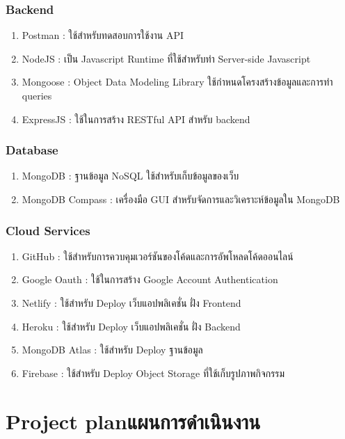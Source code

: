 \subsubsection{Backend}
\begin{enumerate}
    \item Postman\cite{postman} : ใช้สำหรับทดสอบการใช้งาน API
    \item NodeJS\cite{node1} : เป็น Javascript Runtime ที่ใช้สำหรับทำ Server-side Javascript
    \item Mongoose\cite{mongoose} : Object Data Modeling Library ใช้กำหนดโครงสร้างข้อมูลและการทำ queries 
    \item ExpressJS\cite{express1} : ใช้ในการสร้าง RESTful API สำหรับ backend
\end{enumerate}
\subsubsection{Database}
\begin{enumerate}
    \item MongoDB\cite{mongodb} : ฐานข้อมูล NoSQL ใช้สำหรับเก็บข้อมูลของเว็บ
    \item MongoDB Compass\cite{compass} : เครื่องมือ GUI สำหรับจัดการและวิเคราะห์ข้อมูลใน MongoDB
\end{enumerate}
\subsubsection{Cloud Services}
\begin{enumerate} 
    \item GitHub\cite{github} : ใช้สำหรับการควบคุมเวอร์ชันของโค้ดและการอัพโหลดโค้ดออนไลน์
    \item Google Oauth\cite{google} : ใช้ในการสร้าง Google Account Authentication
    \item Netlify\cite{netlify} : ใช้สำหรับ Deploy เว็บแอปพลิเคชั่น ฝั่ง Frontend
    \item Heroku\cite{heroku} : ใช้สำหรับ Deploy เว็บแอปพลิเคชั่น ฝั่ง Backend
    \item MongoDB Atlas\cite{atlas} : ใช้สำหรับ Deploy ฐานข้อมูล
    \item Firebase\cite{firebase} : ใช้สำหรับ Deploy Object Storage ที่ใช้เก็บรูปภาพกิจกรรม
\end{enumerate}
\section{\ifenglish Project plan\else แผนการดำเนินงาน\fi}


